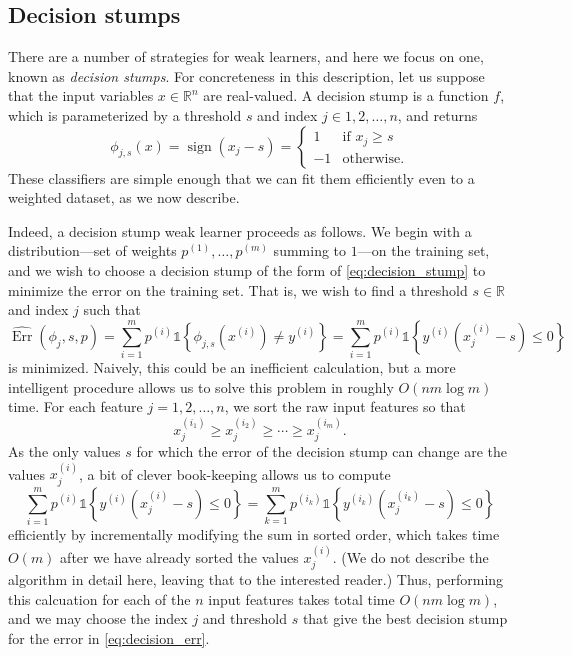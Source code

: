\subsection{Decision stumps}
There are a number of strategies for weak learners, and here we focus on
one, known as \textit{decision stumps}. For concreteness in this description, let
us suppose that the input variables $x \in \mathbb R^n$ are real-valued. A decision
stump is a function $f$, which is parameterized by a threshold $s$ and index
$j \in {1,2,\ldots,n}$, and returns
\begin{equation}\label{eq:decision_stump}
\phi_{j,s}(x) = \operatorname{sign}(x_j - s) = \begin{cases}
    1 & \text{if } x_j \ge s\\
    -1 & \text{otherwise.}
\end{cases}
\end{equation}
These classifiers are simple enough that we can fit them efficiently even to a
weighted dataset, as we now describe.

Indeed, a decision stump weak learner proceeds as follows. We begin with
a distribution---set of weights $p^{(1)} ,\ldots,p^{(m)}$ summing to $1$---on the training
set, and we wish to choose a decision stump of the form of \cref{eq:decision_stump} to minimize the
error on the training set. That is, we wish to find a threshold $s \in \mathbb R$ and
index $j$ such that
\begin{equation}\label{eq:decision_err}
\widehat{\operatorname{Err}}(\phi_j, s, p) = \sum_{i=1}^m p^{(i)} \mathbb{1}\left\{\phi_{j,s} (x^{(i)}) \ne y^{(i)}\right\}
= \sum_{i=1}^m p^{(i)} \mathbb{1}\left\{y^{(i)} (x^{(i)}_j - s) \le 0\right\}
\end{equation}
is minimized. Naively, this could be an inefficient calculation, but a more
intelligent procedure allows us to solve this problem in roughly $O(n m \log m)$
time. For each feature $j = 1,2,\ldots,n$, we sort the raw input features so that
\[
    x^{(i_1)}_j \ge x^{(i_2)}_j \ge \cdots \ge x^{(i_m)}_j.
\]
As the only values $s$ for which the error of the decision stump can change
are the values $x^{(i)}_j$, a bit of clever book-keeping allows us to compute
\[
    \sum_{i=1}^m p^{(i)} \mathbb{1}\left\{y^{(i)} (x^{(i)}_j - s) \le 0 \right\} = \sum_{k=1}^m p^{(i_k)} \mathbb{1}\left\{y^{(i_k)} (x^{(i_k)}_j - s) \le 0\right\}
\]
efficiently by incrementally modifying the sum in sorted order, which takes
time $O(m)$ after we have already sorted the values $x^{(i)}_j$. (We do not describe
the algorithm in detail here, leaving that to the interested reader.) Thus,
performing this calcuation for each of the $n$ input features takes total time
$O(n m \log m)$, and we may choose the index $j$ and threshold $s$ that give the
best decision stump for the error in \cref{eq:decision_err}.

